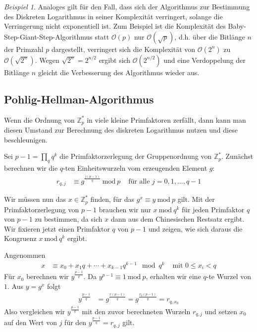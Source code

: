 \documentclass[
  a4paper,
  11pt,
]{scrartcl}
\theoremstyle{plain}
\theoremstyle{definition}
\theoremstyle{remark}
\newtheorem{beispiel}{Beispiel}
\newcommand{\Z}{\mathbb{Z}}
\newcommand{\Mod}[1]{\ \mathrm{mod}\ #1}
\begin{document}
\begin{beispiel}
  Analoges gilt für den Fall, dass sich der Algorithmus zur Bestimmung des Diskreten Logarithmus in seiner Komplexität verringert, solange die Verringerung nicht exponentiell ist. Zum Beispiel ist die Komplexität des Baby-Step-Giant-Step-Algorithmus statt $\mathcal{O}(p)$ nur $\mathcal{O}(\sqrt{p})$, d.h. über die Bitlänge $n$ der Primzahl $p$ dargestellt, verringert sich die Komplexität von $\mathcal{O}(2^n)$ zu $\mathcal{O}(\sqrt{2^n})$. Wegen $\sqrt{2^n} = 2^{n/2}$ ergibt sich $\mathcal{O}(2^{n/2})$ und eine Verdoppelung der Bitlänge $n$ gleicht die Verbesserung des Algorithmus wieder aus.
  
  
\end{beispiel}

\subsection{Pohlig-Hellman-Algorithmus}
\label{sub:pohlig_hellman_algorithmus}

Wenn die Ordnung von $\Z_p^*$ in viele kleine Primfaktoren zerfällt, dann kann
man diesen Umstand zur Berechnung des diskreten Logarithmus nutzen und diese
beschleunigen.

Sei $p-1 = \prod\limits_q q^k$ die Primfaktorzerlegung der Gruppenordnung von
$\Z_p^*$. Zunächst berechnen wir die $q$-ten Einheitswurzeln vom erzeugenden
Element $g$:
\begin{align*}
  r_{q, j} &
    \equiv g^{\frac{j(p-1)}{q}} \Mod{p} &
    \text{ für alle } j = 0, 1, \ldots, q-1
\end{align*}

Wir müssen nun das $x \in \Z_p^*$ finden, für das $g^x \equiv y \Mod{p}$ gilt.
Mit der Primfaktorzerlegung von $p-1$ brauchen wir nur $x \Mod{q^k}$ für jeden
Primfaktor $q$ von $p-1$ zu bestimmen, da sich $x$ dann aus dem Chinesischen
Restsatz ergibt. Wir fixieren jetzt einen Primfaktor $q$ von $p-1$ und zeigen,
wie sich daraus die Kongruenz $x \Mod{q^k}$ ergibt.

Angenommen
\begin{align*}
  x & \equiv x_0 + x_1 q + \cdots + x_{k-1} q^{k-1} \mod q^k
    & \text{ mit } 0 \leq x_i < q
\end{align*}
Für $x_0$ berechnen wir $y^{\frac{p-1}{q}}$. Da $y^{p-1} \equiv 1 \Mod{p}$,
erhalten wir eine $q$-te Wurzel von $1$. Aus $y = g^x$ folgt
\begin{align*}
  y^{\frac{p-1}{q}} &
    = g^{\frac{x(p-1)}{q}}
    = g^{\frac{x_0 (p-1)}{q}}
    = r_{q, x_0}
\end{align*}
Also vergleichen wir $y^{\frac{p-1}{q}}$ mit den zuvor berechneten Wurzeln
$r_{q, j}$ und setzen $x_0$ auf den Wert von $j$ für den
$y^{\frac{p-1}{q}} = r_{q, j}$ gilt.
\end{document}
